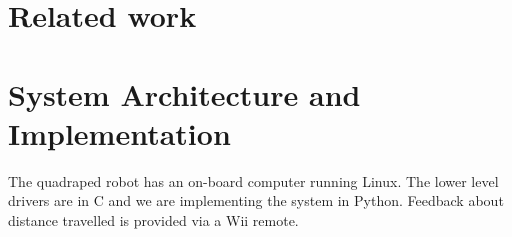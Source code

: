 \section{Related work}

\section{System Architecture and Implementation}

The quadraped robot has an on-board computer running Linux. The lower
level drivers are in C and we are implementing the system in
Python. Feedback about distance travelled is provided via a Wii remote. 

